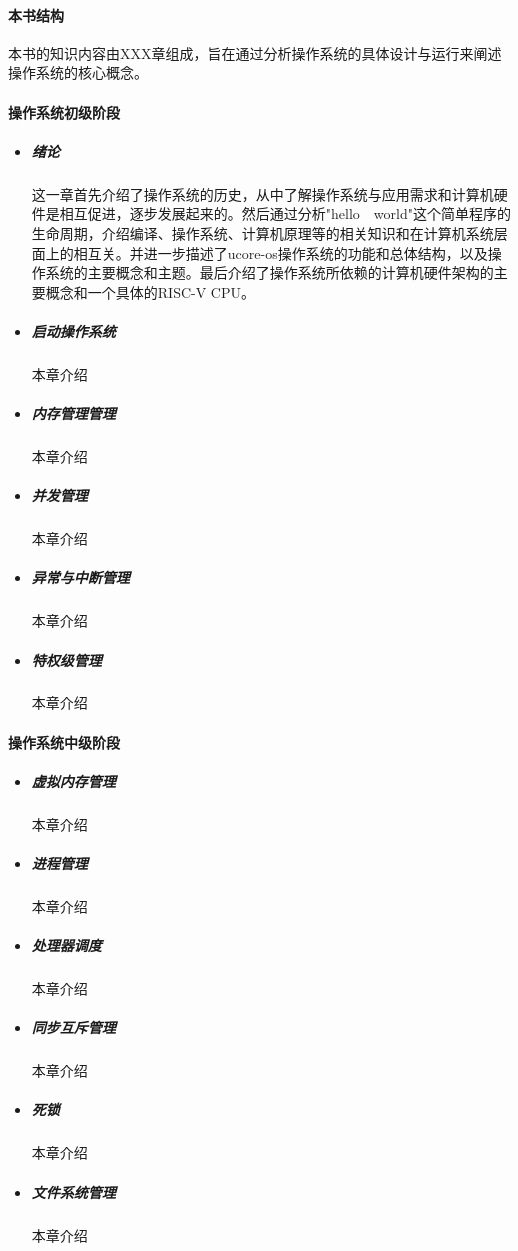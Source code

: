 \documentclass{zhbook}
\begin{document}
\begin{preface}
\paragraph{本书结构}

本书的知识内容由XXX章组成，旨在通过分析操作系统的具体设计与运行来阐述操作系统的核心概念。

\paragraph{操作系统初级阶段}	

\begin{itemize}
	\item
	\subparagraph{绪论} 这一章首先介绍了操作系统的历史，从中了解操作系统与应用需求和计算机硬件是相互促进，逐步发展起来的。然后通过分析"hello　world"这个简单程序的生命周期，介绍编译、操作系统、计算机原理等的相关知识和在计算机系统层面上的相互关。并进一步描述了ucore-os操作系统的功能和总体结构，以及操作系统的主要概念和主题。最后介绍了操作系统所依赖的计算机硬件架构的主要概念和一个具体的RISC-V CPU。

	\item
	\subparagraph{启动操作系统}本章介绍
	\item
	\subparagraph{内存管理管理}本章介绍
	\item
	\subparagraph{并发管理}本章介绍
	\item
	\subparagraph{异常与中断管理}本章介绍
	\item
	\subparagraph{特权级管理}本章介绍
\end{itemize}

\paragraph{操作系统中级阶段}
\begin{itemize}
	\item
	\subparagraph{虚拟内存管理}本章介绍	
	\item
	\subparagraph{进程管理}本章介绍
	\item
	\subparagraph{处理器调度}本章介绍	
	\item
	\subparagraph{同步互斥管理}本章介绍
	\item
	\subparagraph{死锁}本章介绍					
	\item
	\subparagraph{文件系统管理}本章介绍		
\end{itemize}	


\end{preface}
\end{document}
